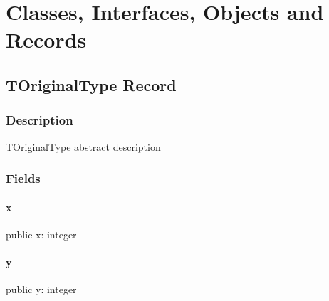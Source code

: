 \documentclass{report}
\begin{document}
\section{Classes, Interfaces, Objects and Records}
\subsection*{TOriginalType Record}
\subsubsection*{\large{\textbf{Description}}\normalsize\hspace{1ex}\hfill}
TOriginalType abstract description\subsubsection*{\large{\textbf{Fields}}\normalsize\hspace{1ex}\hfill}
\paragraph*{x}\hspace*{\fill}

\begin{list}{}{
\setlength{\itemindent}{0cm}
\setlength{\listparindent}{0cm}
\setlength{\leftmargin}{\evensidemargin}
\addtolength{\leftmargin}{\tmplength}
\settowidth{\labelsep}{X}
\addtolength{\leftmargin}{\labelsep}
\setlength{\labelwidth}{\tmplength}
}
\begin{flushleft}
\item[\textbf{Declaration}\hfill]
\begin{ttfamily}
public x: integer \end{ttfamily}


\end{flushleft}
\end{list}
\paragraph*{y}\hspace*{\fill}

\begin{list}{}{
\setlength{\itemindent}{0cm}
\setlength{\listparindent}{0cm}
\setlength{\leftmargin}{\evensidemargin}
\addtolength{\leftmargin}{\tmplength}
\settowidth{\labelsep}{X}
\addtolength{\leftmargin}{\labelsep}
\setlength{\labelwidth}{\tmplength}
}
\begin{flushleft}
\item[\textbf{Declaration}\hfill]
\begin{ttfamily}
public y: integer \end{ttfamily}


\end{flushleft}
\end{list}
\end{document}
